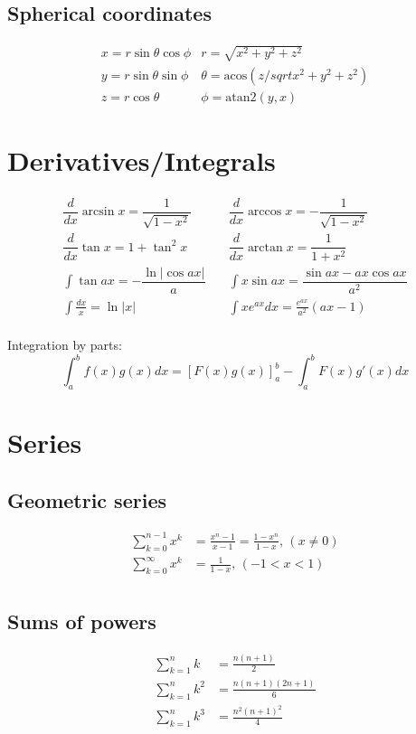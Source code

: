 \subsection{Spherical coordinates}
$$\begin{array}{cc}
x = r\sin\theta\cos\phi & r = \sqrt{x^2+y^2+z^2}\\
y = r\sin\theta\sin\phi & \theta = \textrm{acos}(z/sqrt{x^2+y^2+z^2})\\
z = r\cos\theta & \phi = \textrm{atan2}(y,x)
\end{array}$$

\section{Derivatives/Integrals}
\begin{align*}
\dfrac{d}{dx}\arcsin x = \dfrac{1}{\sqrt{1-x^2}} & \quad
\dfrac{d}{dx}\arccos x = -\dfrac{1}{\sqrt{1-x^2}}\\
\dfrac{d}{dx}\tan x = 1+\tan^2 x & \quad
\dfrac{d}{dx}\arctan x = \dfrac{1}{1+x^2}\\
\int\tan ax = -\dfrac{\ln|\cos ax|}{a} & \quad
\int x\sin ax = \dfrac{\sin ax-ax \cos ax}{a^2}\\
\int \frac{dx}{x} = \ln|x| & \quad
\int xe^{ax}dx = \frac{e^{ax}}{a^2}(ax-1)\\
\end{align*}

Integration by parts:
$$\int_a^bf(x)g(x)dx = [F(x)g(x)]_a^b-\int_a^bF(x)g'(x)dx$$

\section{Series} 
\subsection{Geometric series}
\begin{align*}
\sum_{k=0}^{n-1}x^k &= \frac{x^n-1}{x-1} = \frac{1-x^n}{1-x},\,(x\neq0)\\
\sum_{k=0}^{\infty}x^k &= \frac{1}{1-x},\,(-1<x<1)\\
\end{align*}

\subsection{Sums of powers}
\begin{align*}
\sum_{k=1}^n k &= \frac{n(n+1)}{2}\\
\sum_{k=1}^n k^2 &= \frac{n(n+1)(2n+1)}{6}\\
\sum_{k=1}^n k^3 &= \frac{n^2(n+1)^2}{4}\\
\end{align*}

